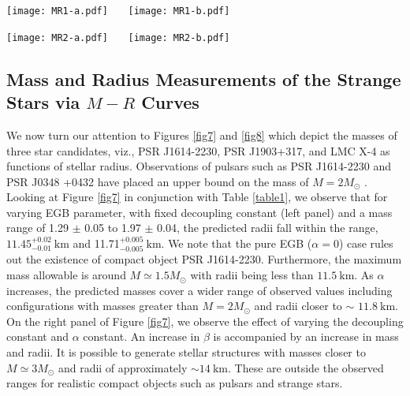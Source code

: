 \documentclass[]{aastex631}
\begin{document}
    \begin{figure*}
    \centering
    \texttt{[image: MR1-a.pdf]}~~~ \texttt{[image: MR1-b.pdf]}
    \caption{The left and right panels show the $M-R$ curves depending on different values $\alpha$ and  $\beta$, respectively when $\theta^0_0=\hat{\epsilon}$.}
    \label{fig7}
\end{figure*}  
\begin{figure*}
    \centering
    \texttt{[image: MR2-a.pdf]}~~~ \texttt{[image: MR2-b.pdf]}
    \caption{The left and right panels show the $M-R$ curves depending on different values of $\alpha$ and  $\beta$, respectively when $\theta^1_1=\hat{P}_r$. }
    \label{fig8}
\end{figure*}
\subsection{Mass and Radius Measurements of the Strange Stars via $M-R$ Curves} \label{sec5.3}
We now turn our attention to Figures \ref{fig7} and \ref{fig8} which depict the masses of three star candidates, viz., PSR J1614-2230, PSR J1903+317, and LMC X-4 as functions of stellar radius. Observations of pulsars such as PSR J1614-2230 and PSR J0348 +0432 have placed an upper bound on the mass of $M= 2 M_{\odot}$ \citep{Ayan1}. Looking at Figure \ref{fig7} in conjunction with Table \ref{table1}, we observe that for varying EGB parameter, with fixed decoupling constant (left panel) and a mass range of 1.29 $\pm$ 0.05 to 1.97 $\pm$ 0.04, the predicted radii fall within the range, $11.45^{+0.02}_{-0.01}~ \text{km}$  and 11.71$^{+0.005}_{-0.005} ~ \text{km}$. We note that the pure EGB ($\alpha = 0$) case rules out the existence of compact object PSR J1614-2230. Furthermore, the maximum mass allowable is around $M \simeq 1.5 M_{\odot}$ with radii being less than $11.5 ~ \text{km}$. As $\alpha$ increases, the predicted masses cover a wider range of observed values including configurations with masses greater than $M = 2 M_{\odot}$ and radii closer to $\sim$ $11.8 ~ \text{km}$. On the right panel of Figure \ref{fig7}, we observe the effect of varying the decoupling constant and $\alpha$ constant. An increase in $\beta$ is accompanied by an increase in mass and radii. It is possible to generate stellar structures with masses closer to $M \simeq 3 M_{\odot}$ and radii of approximately $\sim 14 ~ \text{km}$. These are outside the observed ranges for realistic compact objects such as pulsars and strange stars. 
\end{document}

